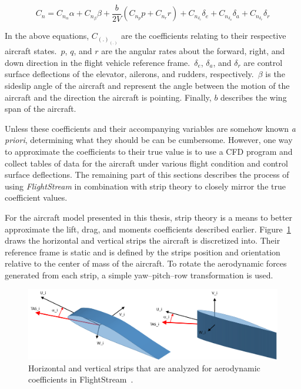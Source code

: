 \begin{equation}\label{eq:yawingmomentcoefficient}
    C_n = C_{n_\alpha}\alpha + C_{n_\beta}\beta + \frac{b}{2V}\left(C_{n_{p}}p + C_{n_r}r\right) + C_{n_{\delta_e}}\delta_e + C_{n_{\delta_a}}\delta_a + C_{n_{\delta_r}}\delta_r
\end{equation}

In the above equations, \(C_{{(.)}_{(.)}}\) are the coefficients relating to their respective aircraft states.~\(p\), \(q\), and \(r\) are the angular rates about the forward, right, and down direction in the flight vehicle reference frame.~\(\delta_e\), \(\delta_a\), and \(\delta_r\) are control surface deflections of the elevator, ailerons, and rudders, respectively.~\( \beta \) is the sideslip angle of the aircraft and represent the angle between the motion of the aircraft and the direction the aircraft is pointing. Finally, \(b\) describes the wing span of the aircraft.

Unless these coefficients and their accompanying variables are somehow known \textit{a priori}, determining what they should be can be cumbersome. However, one way to approximate the coefficients to their true value is to use a CFD program and collect tables of data for the aircraft under various flight condition and control surface deflections. The remaining part of this sections describes the process of using \textit{FlightStream} in combination with strip theory to closely mirror the true coefficient values.

For the aircraft model presented in this thesis, strip theory is a means to better approximate the lift, drag, and moments coefficients described earlier. Figure~\ref{fig:strips} draws the horizontal and vertical strips the aircraft is discretized into. Their reference frame is static and is defined by the strips position and orientation relative to the center of mass of the aircraft. To rotate the aerodynamic forces generated from each strip, a simple yaw{--}pitch{--}row transformation is used.

\begin{figure}[!ht]\label{fig:strips}
    \centering
    \includegraphics[width=0.75\linewidth]{Figures/horvertstrips.png}
    \caption{Horizontal and vertical strips that are analyzed for aerodynamic coefficients in FlightStream~\cite{AerodynamicStripTheory2021}.}
\end{figure}

